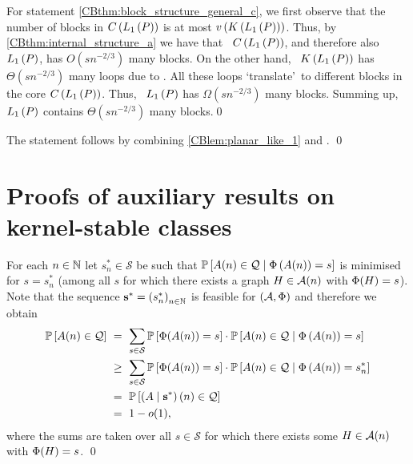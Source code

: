 For statement \ref{CBthm:block_structure_general_c}, we first observe that the number of blocks in $C\left(L_1\left(P\right)\right)$ is at most $v\left({K\left(L_1\left(P\right)\right)}\right)$. Thus, by \ref{CBthm:internal_structure_a} we have that \whp\ $C\left(L_1\left(P\right)\right)$, and therefore also $L_1\left(P\right)$, has $O\left(sn^{-2/3}\right)$ many blocks. On the other hand, \whp\ $K\left(L_1\left(P\right)\right)$ has $\Theta\left(sn^{-2/3}\right)$ many loops due to . All these loops \lq translate\rq\ to different blocks in the core $C\left(L_1\left(P\right)\right)$. Thus, \whp\ $L_1\left(P\right)$ has $\Omega\left(sn^{-2/3}\right)$ many blocks. Summing up, \whp\ $L_1\left(P\right)$ contains $\Theta\left(sn^{-2/3}\right)$ many blocks.\qed

The statement follows by combining \ref{CBlem:planar_like_1} and . \qed

\section{Proofs of auxiliary results on kernel-stable classes}\label{CBsec:proofs_aux}
For each $n\in \mathbb{N}$ let $s_n^\ast \in \mathcal{S}$ be such that $\mathbb{P}\left[A(n) \in \mathcal{Q} \;\middle|\; \Phi\left(A(n)\right)=s\right]$ is minimised for $s=s_n^\ast$ (among all $s$ for which there exists a graph $H\in \mathcal{A}(n)$ with $\Phi(H)=s$). Note that the sequence $\mathbf{s}^\ast=\left(s_n^\ast\right)_{n\in \mathbb{N}}$ is feasible for $(\mathcal{A}, \Phi)$ and therefore we obtain
\begin{align*}
\mathbb{P}\left[A(n) \in \mathcal{Q}\right]
&\ =\ \sum_{s \in \mathcal{S}}\mathbb{P}\left[\Phi(A(n))=s\right] \cdot \mathbb{P}\left[A(n) \in \mathcal{Q} \;\middle|\; \Phi\left(A(n)\right)=s\right]
\\
&\ \geq\ \sum_{s \in \mathcal{S}}\mathbb{P}\left[\Phi(A(n))=s\right]\cdot \mathbb{P}\left[A(n) \in \mathcal{Q} \;\middle|\; \Phi\left(A(n)\right)=s_n^\ast\right]
\\
&\ =\ \mathbb{P}\left[\left(A \mid \mathbf{s}^\ast\right)(n)\in \mathcal{Q}\right]\\
&\ =\ 1-o(1),
\end{align*}
where the sums are taken over all $s\in \mathcal{S}$ for which there exists some $H\in \mathcal{A}(n)$ with $\Phi(H)=s$.
\qed

